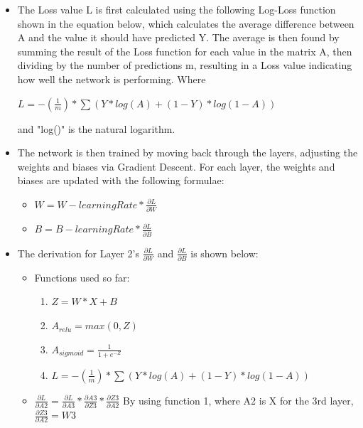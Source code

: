 \documentclass[./project-report/src/latex/project-report.tex]{subfiles}
\begin{document}
\begin{itemize}
    \item The Loss value L is first calculated using the following Log-Loss function shown in the equation below, which calculates the average difference between A and the 
		  value it should have predicted Y. The average is then found by summing the result of the Loss function \cite{datacamp} for each value in the matrix A, then dividing 
		  by the number of predictions m, resulting in a Loss value indicating how well the network is performing.
    	  Where 
       
          $L = -(\frac{1}{m}) * \sum(Y * log(A) + (1-Y) * log(1-A))$ 
       
          and "log()" is the natural logarithm.
    \item The network is then trained by moving back through the layers, adjusting the weights and biases via Gradient Descent. For each layer, the weights and biases are 
		  updated with the following formulae:
    \begin{itemize}
        \item $W = W - learningRate * \frac{\partial{L}}{\partial{W}}$
        \item $B = B - learningRate * \frac{\partial{L}}{\partial{B}}$
    \end{itemize}
    \item The derivation for Layer 2's $\frac{\partial{L}}{\partial{W}}$ and $\frac{\partial{L}}{\partial{B}}$ is shown below:
    \begin{itemize}
        \item Functions used so far:
        \begin{enumerate}
            \item $Z = W * X + B$
            \item $A_{relu} = max(0, Z)$
            \item $A_{sigmoid} = \frac{1}{1+e^{-Z}}$
            \item $L = -(\frac{1}{m}) * \sum(Y * log(A) + (1-Y) * log(1-A))$
        \end{enumerate}
        \item $\frac{\partial{L}}{\partial{A2}} = \frac{\partial{L}}{\partial{A3}} * \frac{\partial{A3}}{\partial{Z3}} * \frac{\partial{Z3}}{\partial{A2}}$
              \vspace{1mm}
              \newline
              By using function 1, where A2 is X for the 3rd layer, $\frac{\partial{Z3}}{\partial{A2}} = W3$

\end{itemize}
\end{itemize}
\end{document}
